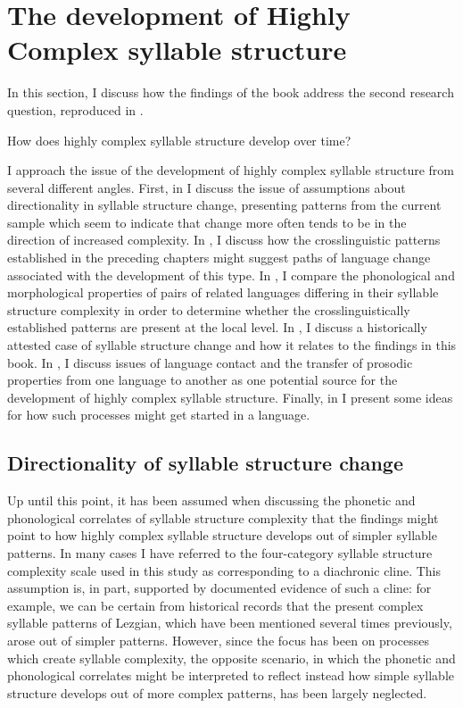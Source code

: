 \section{The development of Highly Complex syllable structure}\label{sec:8.4}

  In this section, I discuss how the findings of the book address the second research question, reproduced in .

\ea\label{ex:8.2}
    {How does highly complex syllable structure develop over time?}
\z

  I approach the issue of the development of highly complex syllable structure from several different angles. First, in  I discuss the issue of assumptions about directionality in syllable structure change, presenting patterns from the current sample which seem to indicate that change more often tends to be in the direction of increased complexity. In , I discuss how the crosslinguistic patterns established in the preceding chapters might suggest paths of language change associated with the development of this type. In , I compare the phonological and morphological properties of pairs of related languages differing in their syllable structure complexity in order to determine whether the crosslinguistically established patterns are present at the local level. In , I discuss a historically attested case of syllable structure change and how it relates to the findings in this book. In , I discuss issues of language contact and the transfer of prosodic properties from one language to another as one potential source for the development of highly complex syllable structure. Finally, in  I present some ideas for how such processes might get started in a language.

\subsection{Directionality of syllable structure change}\label{sec:8.4.1}

  Up until this point, it has been assumed when discussing the phonetic and phonological correlates of syllable structure complexity that the findings might point to how highly complex syllable structure develops out of simpler syllable patterns. In many cases I have referred to the four-category syllable structure complexity scale used in this study as corresponding to a diachronic cline. This assumption is, in part, supported by documented evidence of such a cline: for example, we can be certain from historical records that the present complex syllable patterns of Lezgian, which have been mentioned several times previously, arose out of simpler patterns. However, since the focus has been on processes which create syllable complexity, the opposite scenario, in which the phonetic and phonological correlates might be interpreted to reflect instead how simple syllable structure develops out of more complex patterns, has been largely neglected.

